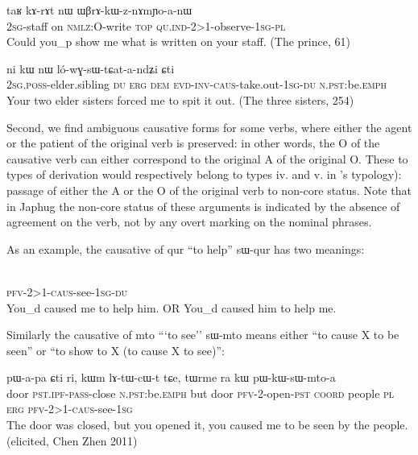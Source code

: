 \documentclass[oldfontcommands,oneside,a4paper,11pt]{memoir}
\newcommand{\ipa}[1]{{\phon #1}} %
\newcommand{\wav}[1]{}%
\newcommand{\caus}{\textsc{caus}}
\newcommand{\coord}{\textsc{coord}}
\newcommand{\dem}{\textsc{dem}}
\newcommand{\du}{\textsc{du}}
\newcommand{\erg}{\textsc{erg}}
\newcommand{\emphat}{\textsc{emph}}
\newcommand{\evd}{\textsc{evd}}
\newcommand{\inv}{\textsc{inv}}
\newcommand{\ipf}{\textsc{ipf}}
\newcommand{\nmlz}{\textsc{nmlz}}
\newcommand{\npst}{\textsc{n.pst}}
\newcommand{\pfv}{\textsc{pfv}}
\newcommand{\pl}{\textsc{pl}}
\newcommand{\pass}{\textsc{pass}}
\newcommand{\poss}{\textsc{poss}}
\newcommand{\pst}{\textsc{pst}}
\newcommand{\sg}{\textsc{sg}}
\newcommand{\topic}{\textsc{top}}
\newcommand{\quind}{\textsc{qu.ind}} %
\begin{document}
 \begin{exe}
\ex
\gll  \ipa{nɤ-tɤɲi} 	\ipa{taʁ} 	\ipa{kɤ-rɤt} 	\ipa{nɯ} 	\ipa{ɯβrɤ-kɯ-z-nɤmɲo-a-nɯ} \\
  2\sg{}-staff on \nmlz{}:O-write \topic{} \quind{}-2>1-observe-1\sg{}-\pl{} \\
  \glt Could you_p show me what is written on your staff. (The prince, 61)
\end{exe} 

 \begin{exe}
\ex
\gll \ipa{nɤ-pi} 	\ipa{ni} 	\ipa{kɯ} 	\ipa{nɯ} 	\ipa{ló-wɣ-sɯ-tɕat-a-ndʑi} 	\ipa{ɕti}  \\
2\sg{}.\poss{}-elder.sibling \du{} \erg{} \dem{} \evd{}-\inv{}-\caus{}-take.out-1\sg{}-\du{} \npst{}:be.\emphat{} \\
  \glt Your two elder sisters forced me to spit it out. (The three sisters, 254)
\end{exe} 

Second, we find ambiguous causative forms for some verbs, where either the agent or the patient of the original verb is preserved: in other words, the O of the causative verb can either correspond to the original A of the original O. These to types of derivation would respectively belong to types iv. and v. in \citet[48]{dixon00causative}'s typology): passage of either the A or the O of the original verb to non-core status. Note that in Japhug the non-core status of these arguments is indicated by the absence of agreement on the verb, not by any overt marking on the nominal phrases. 
 
As an example, the causative of \ipa{qur} ``to help''  \ipa{sɯ-qur} has two meanings:

\begin{exe} 
\ex \label{ex:caus:show.2>3>1}
\gll   \ipa{tɤ-kɯ-sɯ-qur-a-ndʑi}  \\
 \pfv{}-2>1-\caus{}-see-1\sg{}-\du{}  \\
 \glt  You_d caused me to help him. OR You_d caused him to help me. \wav{8_tAkWsWqura}
\end{exe} 

Similarly the causative of \ipa{mto} ```to see'' \ipa{sɯ-mto} means either ``to cause X to be seen'' or ``to show to X (to cause X to see)'':

\begin{exe} 
\ex \label{ex:caus:show.2>3>1}
\gll  \ipa{kɯm} 	\ipa{pɯ-a-pa} 	\ipa{ɕti} 	\ipa{ri,} 	\ipa{kɯm} 	\ipa{lɤ-tɯ-cɯ-t} 	\ipa{tɕe,} 	\ipa{tɯrme} 	\ipa{ra} 	\ipa{kɯ} 	\ipa{pɯ-kɯ-sɯ-mto-a}  \\
door \pst{}.\ipf{}-\pass{}-close \npst{}:be.\emphat{} but door \pfv{}-2-open-\pst{} \coord{} people \pl{} \erg{}  \pfv{}-2>1-\caus{}-see-1\sg{}  \\
 \glt The door was closed, but you opened it, you caused me to be seen by the people. (elicited, Chen Zhen 2011) \wav{8_pWkWsWmtoa} 
\end{exe} 
\end{document}
